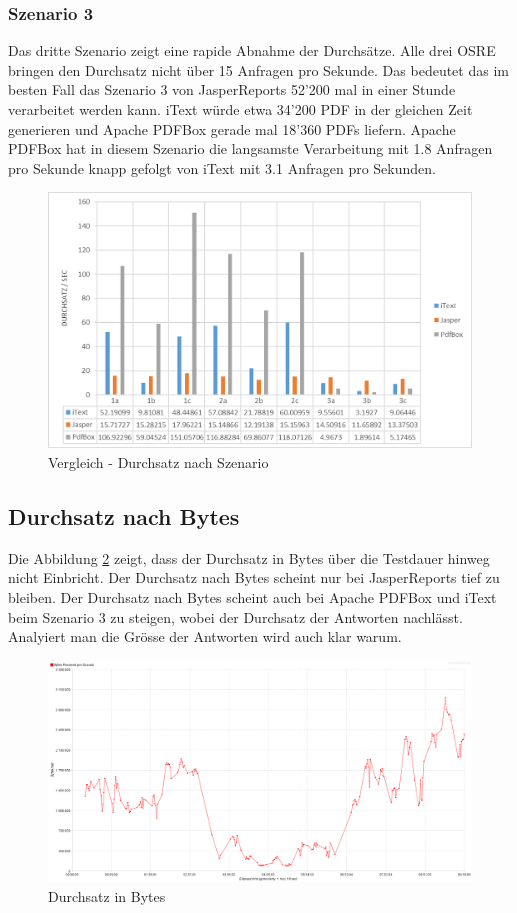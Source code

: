 \documentclass[main.tex]{subfiles}
\begin{document}
\subsubsection{Szenario 3}
Das dritte Szenario zeigt eine rapide Abnahme der Durchsätze. Alle drei OSRE bringen den Durchsatz nicht über 15 Anfragen pro Sekunde. Das bedeutet das im besten Fall das Szenario 3 von JasperReports 52'200 mal in einer Stunde verarbeitet werden kann. iText würde etwa 34'200 PDF in der gleichen Zeit generieren und Apache PDFBox gerade mal 18'360 PDFs liefern. 
Apache PDFBox hat in diesem Szenario die langsamste Verarbeitung mit 1.8 Anfragen pro Sekunde knapp gefolgt von iText mit 3.1 Anfragen pro Sekunden. 

\begin{figure}[!ht]
\includegraphics[width=\textwidth]{mainpart/4_analyse_img/VglDurchSzen.png}
 \caption{Vergleich - Durchsatz nach Szenario}
 \label{figure:throughputSzen}
\end{figure}

\subsection{Durchsatz nach Bytes}
Die Abbildung \ref{figure:throughputBytesAll} zeigt, dass der Durchsatz in Bytes über die Testdauer hinweg nicht Einbricht. Der Durchsatz nach Bytes scheint nur bei JasperReports tief zu bleiben. Der Durchsatz nach Bytes scheint auch bei Apache PDFBox und iText beim Szenario 3 zu steigen,  wobei der Durchsatz der Antworten nachlässt. Analyiert man die Grösse der Antworten wird auch klar warum. 
\begin{figure}[!h]
\includegraphics[width=\textwidth]{mainpart/4_analyse_img/ThroughputOverTimeAll.png}
 \caption{Durchsatz in Bytes}
 \label{figure:throughputBytesAll}
\end{figure}
\end{document}

